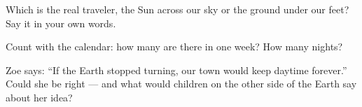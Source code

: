 \begin{exercise}[$\star$]\label{exo:g1:day-and-night:7}
Which is the real traveler, the Sun across our sky or the ground
under our feet? Say it in your own words.
\end{exercise}

\begin{exercise}[$\star$]\label{exo:g1:day-and-night:8}
Count with the calendar: how many  are there in one week?
How many nights?
\end{exercise}

\begin{exercise}[$\star\star$]\label{exo:g1:day-and-night:9}
Zoe says: ``If the Earth stopped turning, our town would keep daytime
forever.'' Could she be right --- and what would children on the
other side of the Earth say about her idea?
\end{exercise}
